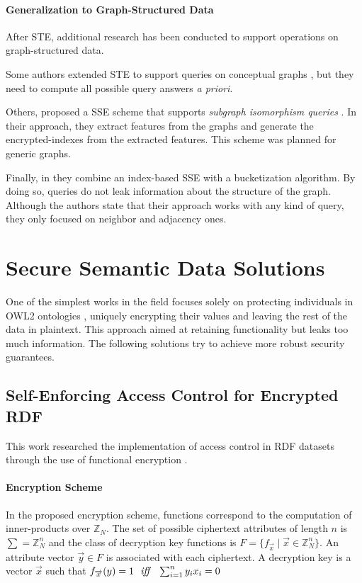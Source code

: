 \paragraph{Generalization to Graph-Structured Data}
After \gls{STE}, additional research has been conducted to support operations on graph-structured data. 

Some authors extended \gls{STE} to support queries on conceptual graphs \autocite{Poh2012-qs}, but they need to compute all possible query answers \emph{a priori}. 

Others, proposed a \gls{SSE} scheme that supports \emph{subgraph isomorphism queries} \autocite{Cao2011-is}. In their approach, they extract features from the graphs and generate the encrypted-indexes from the extracted features. This scheme was planned for generic graphs.

Finally, in \autocite{Suntaxi2021-sj} they combine an index-based \gls{SSE} with a bucketization algorithm. By doing so, queries do not leak information about the structure of the graph. Although the authors state that their approach works with any kind of query, they only focused on neighbor and adjacency ones. 

\section{Secure Semantic Data Solutions}
\label{ch2:secure-semantic-data}

One of the simplest works in the field focuses solely on protecting individuals in \gls{OWL2} ontologies \autocite{Nejjahi2019-ig}, uniquely encrypting their values and leaving the rest of the data in plaintext. This approach aimed at retaining functionality but leaks too much information. The following solutions try to achieve more robust security guarantees.

\subsection{Self-Enforcing Access Control for Encrypted RDF}

This work researched the implementation of access control in RDF datasets \autocite{Fernandez2017-bh} through the use of functional encryption \autocite{Boneh2010-bw}.

\paragraph{Encryption Scheme} In the proposed encryption scheme, functions correspond to the computation of inner-products over $\mathbb{Z}_N$. The set of possible ciphertext attributes of length $n$ is $\sum = \mathbb{Z}^n_N$ and the class of decryption key functions is $F =\{ f_{\overrightarrow{x}} \; | \; \overrightarrow{x} \in \mathbb{Z}^n_N\}$. An attribute vector $\overrightarrow{y} \in F$ is associated with each ciphertext. A decryption key is a vector $\overrightarrow{x}$ such that $f_{\overrightarrow{x}}(y) = 1 \:\:\: \textrm{\emph{iff}} \:\:\:\sum^n_{i = 1} y_ix_i = 0$

